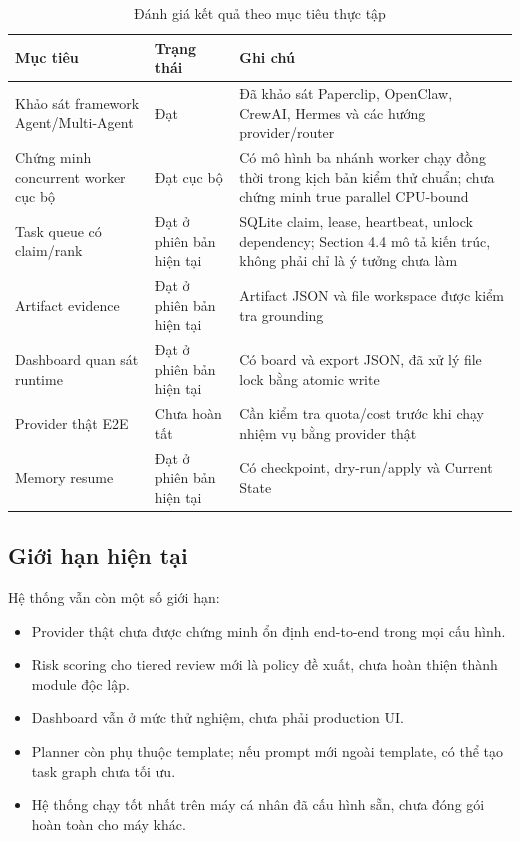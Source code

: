 \documentclass[12pt,a4paper]{article}
\begin{document}
\begin{table}[H]
\centering
\caption{Đánh giá kết quả theo mục tiêu thực tập}
\begin{tabular}{p{}p{}p{}}
\toprule
\textbf{Mục tiêu} & \textbf{Trạng thái} & \textbf{Ghi chú} \\
\midrule
Khảo sát framework Agent/Multi-Agent & Đạt & Đã khảo sát Paperclip, OpenClaw, CrewAI, Hermes và các hướng provider/router \\
Chứng minh concurrent worker cục bộ & Đạt cục bộ & Có mô hình ba nhánh worker chạy đồng thời trong kịch bản kiểm thử chuẩn; chưa chứng minh true parallel CPU-bound \\
Task queue có claim/rank & Đạt ở phiên bản hiện tại & SQLite claim, lease, heartbeat, unlock dependency; Section 4.4 mô tả kiến trúc, không phải chỉ là ý tưởng chưa làm \\
Artifact evidence & Đạt ở phiên bản hiện tại & Artifact JSON và file workspace được kiểm tra grounding \\
Dashboard quan sát runtime & Đạt ở phiên bản hiện tại & Có board và export JSON, đã xử lý file lock bằng atomic write \\
Provider thật E2E & Chưa hoàn tất & Cần kiểm tra quota/cost trước khi chạy nhiệm vụ bằng provider thật \\
Memory resume & Đạt ở phiên bản hiện tại & Có checkpoint, dry-run/apply và Current State \\
\bottomrule
\end{tabular}
\end{table}

\subsection{Giới hạn hiện tại}

Hệ thống vẫn còn một số giới hạn:

\begin{itemize}
    \item Provider thật chưa được chứng minh ổn định end-to-end trong mọi cấu hình.
    \item Risk scoring cho tiered review mới là policy đề xuất, chưa hoàn thiện thành module độc lập.
    \item Dashboard vẫn ở mức thử nghiệm, chưa phải production UI.
    \item Planner còn phụ thuộc template; nếu prompt mới ngoài template, có thể tạo task graph chưa tối ưu.
    \item Hệ thống chạy tốt nhất trên máy cá nhân đã cấu hình sẵn, chưa đóng gói hoàn toàn cho máy khác.
\end{itemize}
\end{document}
